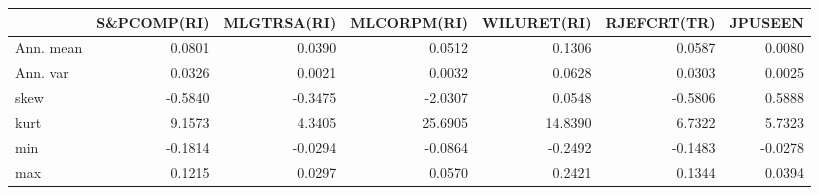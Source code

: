 \begin{tabular}{lrrrrrr}
\toprule
{} &  S\&PCOMP(RI) &  MLGTRSA(RI) &  MLCORPM(RI) &  WILURET(RI) &  RJEFCRT(TR) &  JPUSEEN \\
\midrule
Ann. mean &       0.0801 &       0.0390 &       0.0512 &       0.1306 &       0.0587 &   0.0080 \\
Ann. var  &       0.0326 &       0.0021 &       0.0032 &       0.0628 &       0.0303 &   0.0025 \\
skew      &      -0.5840 &      -0.3475 &      -2.0307 &       0.0548 &      -0.5806 &   0.5888 \\
kurt      &       9.1573 &       4.3405 &      25.6905 &      14.8390 &       6.7322 &   5.7323 \\
min       &      -0.1814 &      -0.0294 &      -0.0864 &      -0.2492 &      -0.1483 &  -0.0278 \\
max       &       0.1215 &       0.0297 &       0.0570 &       0.2421 &       0.1344 &   0.0394 \\
\bottomrule
\end{tabular}
